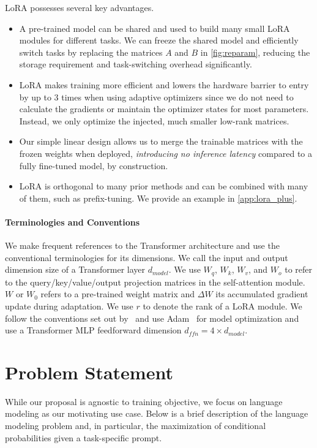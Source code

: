 LoRA possesses several key advantages.
\begin{itemize}[topsep=6pt,itemsep=3pt,partopsep=4pt, parsep=4pt]
\item
A pre-trained model can be shared and used to build many small LoRA modules for different tasks.
We can freeze the shared model and efficiently switch tasks by replacing the matrices $A$ and $B$ in \autoref{fig:reparam}, reducing the storage requirement and task-switching overhead significantly.

\item
LoRA makes training more efficient and lowers the hardware barrier to entry by up to 3 times when using adaptive optimizers since we do not need to calculate the gradients or maintain the optimizer states for most parameters.
Instead, we only optimize the injected, much smaller low-rank matrices.%


\item
Our simple linear design allows us to merge the trainable matrices with the frozen weights when deployed, \textit{introducing no inference latency} compared to a fully fine-tuned model, by construction.

\item
LoRA is orthogonal to many prior methods and can be combined with many of them, such as prefix-tuning. We provide an example in \autoref{app:lora_plus}.

\end{itemize}

\paragraph{Terminologies and Conventions}
We make frequent references to the Transformer architecture and use the conventional terminologies for its dimensions.
We call the input and output dimension size of a Transformer layer $d_{model}$.
We use $W_q$, $W_k$, $W_v$, and $W_o$ to refer to the query/key/value/output projection matrices in the self-attention module.
$W$ or $W_0$ refers to a pre-trained weight matrix and $\Delta W$ its accumulated gradient update during adaptation.
We use $r$ to denote the rank of a LoRA module.
We follow the conventions set out by~\citep{vaswani2017attention, brown_language_2020} and use Adam~\citep{loshchilov2019decoupled, kingma2017adam} for model optimization and use a Transformer MLP feedforward dimension $d_{ffn} = 4 \times d_{model}$.



\section{Problem Statement}
\label{sec:problem_statement}
While our proposal is agnostic to training objective, we focus on language modeling as our motivating use case.
Below is a brief description of the language modeling problem and, in particular, the maximization of conditional probabilities given a task-specific prompt.

